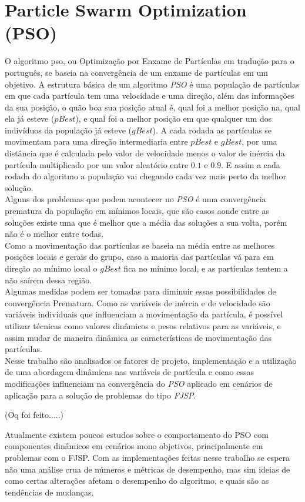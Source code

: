 \section{Particle Swarm Optimization (PSO)}
\indent O algoritmo \gls{pso}, ou Optimização por Enxame de Partículas em tradução para o português, se baseia na convergência de um enxame de partículas em um objetivo.
A estrutura básica de um algoritmo \textit{PSO} é uma população de partículas em que cada partícula tem uma velocidade e uma direção, além das informações da sua posição, o quão boa sua posição atual é, qual foi a melhor posição na, qual ela já esteve ($pBest$), e qual foi a melhor posição em que qualquer um dos indivíduos da população já esteve ($gBest$).
A cada rodada as partículas se movimentam para uma direção intermediaria entre $pBest$ e $gBest$, por uma distância que é calculada pelo valor de velocidade menos o valor de inércia da partícula multiplicado por um valor aleatório entre $0.1$ e $0.9$. 
E assim a cada rodada do algoritmo a população vai chegando cada vez mais perto da melhor solução.\\
\indent Alguns dos problemas que podem acontecer no \textit{PSO} é uma convergência prematura da população em mínimos locais,
que são casos aonde entre as soluções existe uma que é melhor que a média das soluções a sua volta, porém não é o melhor entre todas.\\
Como a movimentação das partículas se baseia na média entre as melhores posições locais e gerais do grupo, caso a maioria das partículas vá para em direção ao mínimo local o $gBest$ fica no mínimo local, e as partículas tentem a não saírem dessa região.\\
\indent Algumas medidas podem ser tomadas para diminuir essas possibilidades de convergência Prematura.
Como as variáveis de inércia e de velocidade são variáveis individuais que influenciam a movimentação da partícula, é possível utilizar técnicas como valores dinâmicos e pesos relativos para as variáveis, e assim mudar de maneira dinâmica as características de movimentação das partículas.\\
\indent Nesse trabalho são analisados os fatores de projeto, implementação e a utilização de uma abordagem dinâmicas nas variáveis de partícula e como essas modificações influenciam na convergência do \textit{PSO} aplicado em cenários de aplicação para a solução de problemas do tipo \textit{FJSP}.


(Oq foi feito.....)

Atualmente existem poucos estudos sobre o comportamento do PSO com componentes dinâmicos em cenários mono objetivos, principalmente em problemas com o FJSP. 
%
Com as implementações feitas nesse trabalho se espera não uma análise crua de números e métricas de desempenho, mas sim ideias de como certas alterações afetam o desempenho do algoritmo, e quais são as tendências de mudanças.
